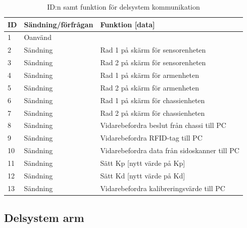 \begin{table}[H]
\centering
\label{callbacks-komm}
\begin{tabularx}{\textwidth}{|l|l|X|}
\hline
\textbf{ID} & \textbf{Sändning/förfrågan} & \textbf{Funktion [data]} \\ \hline
1 & Oanvänd & \\ \hline
2 & Sändning & Rad 1 på skärm för sensorenheten \\ \hline
3 & Sändning & Rad 2 på skärm för sensorenheten \\ \hline
4 & Sändning & Rad 1 på skärm för armenheten \\ \hline
5 & Sändning & Rad 2 på skärm för armenheten \\ \hline
6 & Sändning & Rad 1 på skärm för chassienheten \\ \hline
7 & Sändning & Rad 2 på skärm för chassienheten \\ \hline
8 & Sändning & Vidarebefordra beslut från chassi till PC \\ \hline
9 & Sändning & Vidarebefordra RFID-tag till PC\\ \hline
10 & Sändning & Vidarebefordra data från sidoskanner till PC \\ \hline
11 & Sändning & Sätt Kp [nytt värde på Kp] \\ \hline
12 & Sändning & Sätt Kd [nytt värde på Kd] \\ \hline
13 & Sändning & Vidarebefordra kalibreringsvärde till PC \\ \hline
\end{tabularx}
\caption{ID:n samt funktion för delsystem kommunikation}
\end{table}

\subsection{Delsystem arm}

